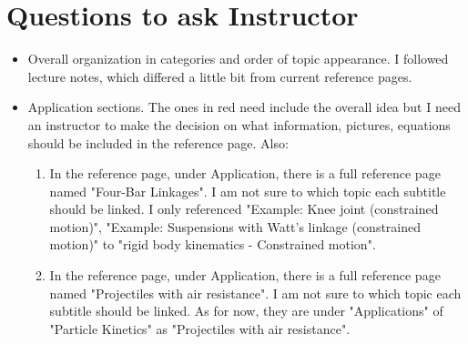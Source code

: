 \section{Questions to ask Instructor}

\begin{itemize}
    \item Overall organization in categories and order of topic appearance. I followed lecture notes, which differed a little bit from current reference pages.
    \item Application sections. The ones in red need include the overall idea but I need an instructor to make the decision on what information, pictures, equations should be included in the reference page. Also:

        \begin{enumerate}
        \item In the reference page, under Application, there is a full reference page named "Four-Bar Linkages". I am not sure to which topic each subtitle should be linked. I only referenced "Example: Knee joint (constrained motion)", "Example: Suspensions with Watt's linkage (constrained motion)" to "rigid body kinematics - Constrained motion".
        \item In the reference page, under Application, there is a full reference page named "Projectiles with air resistance". I am not sure to which topic each subtitle should be linked. As for now, they are under "Applications" of "Particle Kinetics" as "Projectiles with air resistance".
\end{enumerate}
    
\end{itemize}

